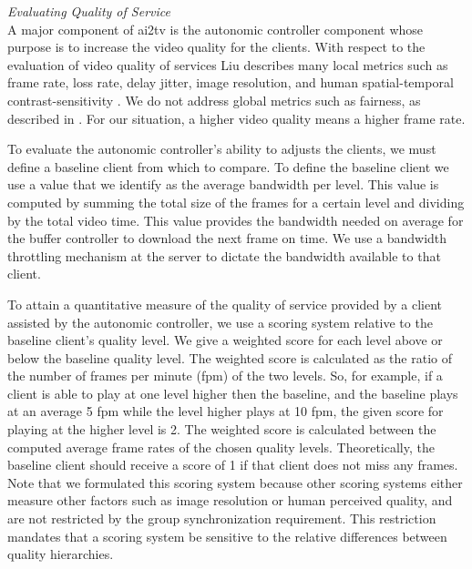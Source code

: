 \documentclass{sig-alternate}
\begin{document}
\textit{Evaluating Quality of Service} \\
A major component of ai2tv is the autonomic controller component whose
purpose is to increase the video quality for the clients.  With
respect to the evaluation of video quality of services Liu describes
many local metrics such as frame rate, loss rate, delay jitter, image
resolution, and human spatial-temporal contrast-sensitivity
\cite{LIU}.  We do not address global metrics such as fairness, as
described in \cite{LIU}.  For our situation, a higher video quality
means a higher frame rate.

To evaluate the autonomic controller's ability to adjusts the clients,
we must define a baseline client from which to compare.  To define the
baseline client we use a value that we identify as the average
bandwidth per level.  This value is computed by summing the total size
of the frames for a certain level and dividing by the total video
time.  This value provides the bandwidth needed on average for the
buffer controller to download the next frame on time.  We use a
bandwidth throttling mechanism \cite{SHAPERD} at the server to dictate
the bandwidth available to that client.

To attain a quantitative measure of the quality of service provided by
a client assisted by the autonomic controller, we use a scoring system
relative to the baseline client's quality level.  We give a weighted
score for each level above or below the baseline quality level.  The
weighted score is calculated as the ratio of the number of frames per
minute (fpm) of the two levels.  So, for example, if a client is able
to play at one level higher then the baseline, and the baseline plays
at an average 5 fpm while the level higher plays at 10 fpm, the given
score for playing at the higher level is 2.  The weighted score is
calculated between the computed average frame rates of the chosen
quality levels.  Theoretically, the baseline client should receive a
score of 1 if that client does not miss any frames.  Note that we
formulated this scoring system because other scoring systems
\cite{scoring systems} either measure other factors such as image
resolution or human perceived quality, and are not restricted by the
group synchronization requirement.  This restriction mandates that a
scoring system be sensitive to the relative differences between
quality hierarchies.
\end{document}
